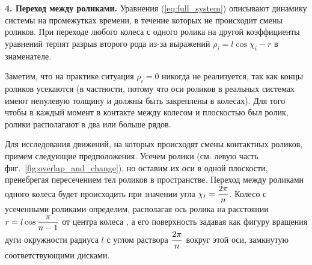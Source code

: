 {\bf 4. Переход между роликами.}
Уравнения (\ref{eq:full_system}) описывают динамику системы на промежутках времени, в течение которых не происходит смены роликов. 
При переходе любого колеса с одного ролика на другой коэффициенты уравнений терпят разрыв второго рода из-за выражений $\rho_i = l\cos\chi_i-r$ в знаменателе.


Заметим, что на практике ситуация $\rho_i = 0$ никогда не реализуется, так как концы роликов усекаются (в частности, потому что оси роликов в реальных системах имеют ненулевую толщину и должны быть закреплены в колесах). Для того чтобы в каждый момент в контакте между колесом и плоскостью был ролик, ролики располагают в два или больше рядов. %

Для исследования движений, на которых происходят смены контактных роликов, примем следующие предположения. Усечем ролики (см. левую часть фиг.~\ref{fig:overlap_and_change}), но оставим их оси в одной плоскости, пренебрегая пересечением тел роликов в пространстве. Переход между роликами одного колеса будет происходить при значении угла $\chi_i = \displaystyle\frac{\displaystyle 2\pi}{\displaystyle n}$. Колесо с усеченными роликами определим, располагая ось ролика на расстоянии $r = l\cos\displaystyle\frac{\displaystyle \pi}{\displaystyle n-1}$ от центра колеса
, а его поверхность задавая как фигуру вращения дуги окружности радиуса $l$ с углом раствора $\displaystyle\frac{\displaystyle 2\pi}{\displaystyle n}$ вокруг этой оси, замкнутую соответствующими дисками.

